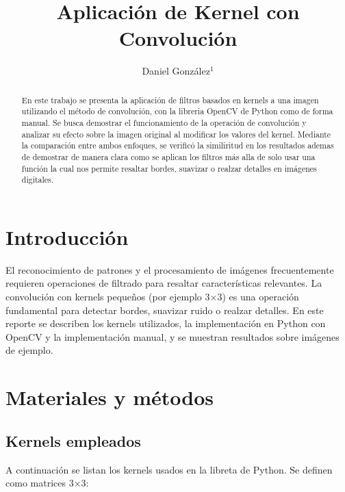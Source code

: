 \documentclass{iopjournal}
\begin{document}

\title{Aplicación de Kernel con Convolución}

\author{Daniel González$^1$}




\begin{abstract}
En este trabajo se presenta la aplicación de filtros basados en kernels a una imagen utilizando el método de convolución, 
con la libreria OpenCV de Python como de forma manual. Se busca demostrar el funcionamiento de 
la operación de convolución y analizar su efecto sobre la imagen original al modificar los valores del kernel. Mediante la
comparación entre ambos enfoques, se verificó la similiritud en los resultados ademas de demostrar de manera clara como se aplican 
los filtros más alla de solo usar una función la cual nos permite resaltar bordes, suavizar o realzar detalles en imágenes digitales.
\end{abstract}


\section{Introducción}
El reconocimiento de patrones y el procesamiento de imágenes frecuentemente requieren operaciones de filtrado para resaltar características relevantes. La convolución con kernels pequeños (por ejemplo 3×3) es una operación fundamental para detectar bordes, suavizar ruido o realzar detalles. En este reporte se describen los kernels utilizados, la implementación en Python con OpenCV y la implementación manual, y se muestran resultados sobre imágenes de ejemplo.

\section{Materiales y métodos}
\subsection{Kernels empleados}
A continuación se listan los kernels usados en la libreta de Python. Se definen como matrices 3×3:
\end{document}
